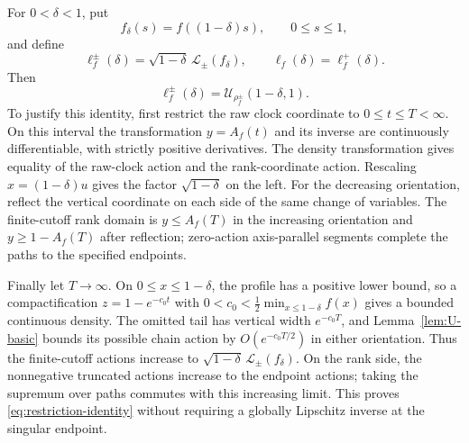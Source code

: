 \documentclass[11pt]{article}
\theoremstyle{remark}
\newcommand{\calL}{\mathcal L}
\newcommand{\calU}{\mathcal U}
\begin{document}
For $0<\delta<1$, put
\begin{equation}\label{eq:truncated-profile}
        f_\delta(s)=f((1-\delta)s),
        \qquad 0\le s\le1,
\end{equation}
and define
\begin{equation}\label{eq:ell-delta}
        \ell_f^{\pm}(\delta)
        =\sqrt{1-\delta}\,\calL_\pm(f_\delta),
        \qquad \ell_f(\delta)=\ell_f^+(\delta).
\end{equation}
Then
\begin{equation}\label{eq:restriction-identity}
        \ell_f^{\pm}(\delta)
        =\calU_{\rho_f^{\pm}}(1-\delta,1).
\end{equation}
To justify this identity, first restrict the raw clock coordinate to
$0\le t\le T<\infty$.  On this interval the transformation $y=A_f(t)$
and its inverse are continuously differentiable, with strictly positive
derivatives.  The density transformation gives equality of the raw-clock
action and the rank-coordinate action.  Rescaling
$x=(1-\delta)u$ gives the factor $\sqrt{1-\delta}$ on the left.
For the decreasing orientation, reflect the vertical coordinate on each
side of the same change of variables.  The finite-cutoff rank domain is
$y\le A_f(T)$ in the increasing orientation and $y\ge1-A_f(T)$ after
reflection; zero-action axis-parallel segments complete the paths to the
specified endpoints.

Finally let $T\to\infty$.  On $0\le x\le1-\delta$, the profile has a
positive lower bound, so a compactification $z=1-e^{-c_0t}$ with
$0<c_0<\frac12\min_{x\le1-\delta}f(x)$ gives a bounded continuous density.
The omitted tail has vertical width $e^{-c_0T}$, and
Lemma~\ref{lem:U-basic} bounds its possible chain action by
$O(e^{-c_0T/2})$ in either orientation.  Thus the finite-cutoff actions
increase to $\sqrt{1-\delta}\,\calL_\pm(f_\delta)$.
On the rank side, the nonnegative truncated actions increase to the
endpoint actions; taking the supremum over paths commutes with this
increasing limit.  This proves \eqref{eq:restriction-identity} without
requiring a globally Lipschitz inverse at the singular endpoint.
\end{document}
